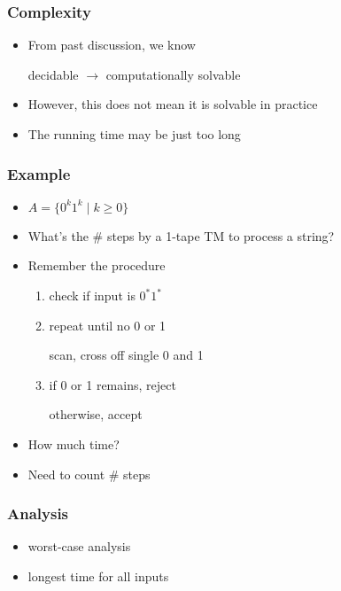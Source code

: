




\begin{frame}[allowframebreaks] \frametitle{Complexity}
  \begin{itemize}
  \item From past discussion, we know
    \begin{center}
    decidable $\rightarrow$ computationally solvable
  \end{center}
\item However, this does not mean it is solvable in practice
\item The running time may be just too long
\end{itemize}\end{frame} \begin{frame}[allowframebreaks] \frametitle{Example}
  \begin{itemize}
\item $A=\{0^k 1^k\mid k \geq 0\}$

\item [] What's the \# steps by a 1-tape TM to process a string? 
\item Remember the procedure
  \begin{enumerate}
  \item check if input is $0^* 1^*$
  \item repeat until no 0 or 1

scan, cross off single 0 and 1
\item if 0 or 1 remains, reject

otherwise, accept

  \end{enumerate}
\item How much time?

\item [] Need to count \# steps
\end{itemize}\end{frame} \begin{frame}[allowframebreaks] \frametitle{Analysis}
  \begin{itemize}
\item worst-case analysis

\item [] longest time for all inputs


\end{itemize}
\end{frame}
